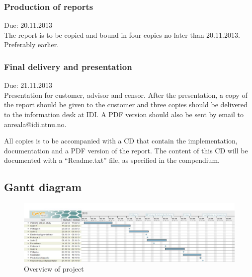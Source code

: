 \documentclass[11pt]{book}
\begin{document}
\subsubsection{Production of reports}
Due: 20.11.2013\\
The report is to be copied and bound in four copies no later than 20.11.2013. Preferably earlier.

\subsubsection{Final delivery and presentation}
Due: 21.11.2013\\
Presentation for customer, advisor and censor. After the presentation, a copy of the report should be given to the customer and three copies should be delivered to the information desk at IDI. A PDF version should also be sent by email to anreala@idi.ntnu.no.

All copies is to be accompanied with a CD that contain the implementation, documentation and a PDF version of the report. The content of this CD will be documented with a ``Readme.txt'' file, as specified in the compendium.

\subsection{Gantt diagram}
\begin{figure}[H]
      \centering
      \includegraphics[width=1.0\textwidth]{Figures/gantt.jpg}
      \caption{Overview of project}
      \label{fig:plan_gantt}
\end{figure}
\end{document}
